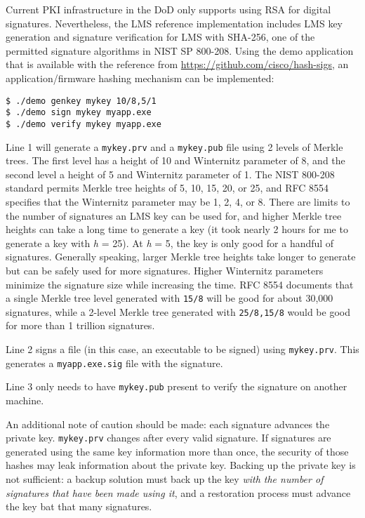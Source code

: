 Current PKI infrastructure in the DoD only supports using RSA for digital signatures. Nevertheless, the LMS reference implementation includes LMS key generation and signature verification for LMS with SHA-256, one of the permitted signature algorithms in NIST SP 800-208.\autocite[§ 4.1]{20220919:800-208} Using the demo application that is available with the reference from \url{https://github.com/cisco/hash-sigs}, an application/firmware hashing mechanism can be implemented:

\begin{lstlisting}[caption={LMS Signature of my.exe},captionpos=b,style=BashStyle,label={lst:20220919:lms}]
$ ./demo genkey mykey 10/8,5/1
$ ./demo sign mykey myapp.exe
$ ./demo verify mykey myapp.exe
\end{lstlisting}

Line 1 will generate a \texttt{mykey.prv} and a \texttt{mykey.pub} file using 2 levels of Merkle trees. The first level has a height of 10 and Winternitz parameter of 8, and the second level a height of 5 and Winternitz parameter of 1. The NIST 800-208 standard permits Merkle tree heights of 5, 10, 15, 20, or 25, and RFC 8554 specifies that the Winternitz parameter may be 1, 2, 4, or 8. There are limits to the number of signatures an LMS key can be used for, and higher Merkle tree heights can take a long time to generate a key (it took nearly 2 hours for me to generate a key with \textit{h} = 25). At \textit{h} = 5, the key is only good for a handful of signatures. Generally speaking, larger Merkle tree heights take longer to generate but can be safely used for more signatures. Higher Winternitz parameters minimize the signature size while increasing the time. RFC 8554 documents that a single Merkle tree level generated with \texttt{15/8} will be good for about 30,000 signatures, while a 2-level Merkle tree generated with \texttt{25/8,15/8} would be good for more than 1 trillion signatures.

Line 2 signs a file (in this case, an executable to be signed) using \texttt{mykey.prv}. This generates a \texttt{myapp.exe.sig} file with the signature.

Line 3 only needs to have \texttt{mykey.pub} present to verify the signature on another machine.

An additional note of caution should be made: each signature advances the private key. \texttt{mykey.prv} changes after every valid signature. If signatures are generated using the same key information more than once, the security of those hashes may leak information about the private key. Backing up the private key is not sufficient: a backup solution must back up the key \textit{with the number of signatures that have been made using it}, and a restoration process must advance the key bat that many signatures.

